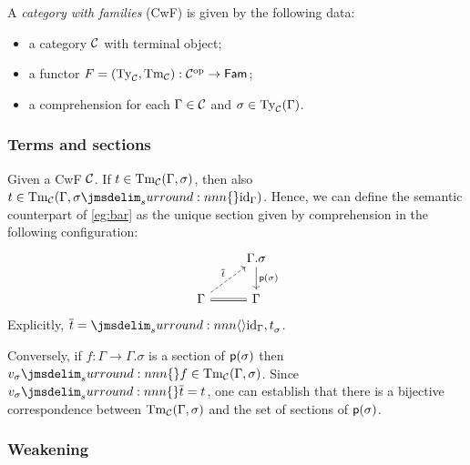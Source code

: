 \documentclass[a4paper]{article}
\begin{document}
\begin{definition}
  A \emph{category with families} (CwF) is given by the following data:
  \begin{itemize}
  \item a category $\mathcal{C}$ with terminal object;
  \item a functor $F = (\operatorname{Ty}_{\mathcal{C}},\operatorname{Tm}_{\mathcal{C}}) : \mathcal{C}^{\mathrm{op}} \to \mathsf{Fam}$;
  \item a comprehension for each $\Gamma \in \mathcal{C}$ and $\sigma \in \operatorname{Ty}_{\mathcal{C}}(\Gamma)$.
  \end{itemize}
\end{definition}

\subsubsection{Terms and sections}\label{sec:tas}

Given a CwF $\mathcal{C}$.
If $t \in \operatorname{Tm}_{\mathcal{C}}(\Gamma,\sigma)$, then also $t \in \Tm{\cC}(\Gamma,\semSubst{\sigma}{\id{\Gamma}})$.
Hence, we can define the semantic counterpart of \cref{eg:bar} as the unique section given by comprehension in the following configuration:
\[\begin{tikzcd}
    & {\Gamma.\sigma} \\
    \Gamma & \Gamma
    \arrow["{\ctxExt(\sigma)}", from=1-2, to=2-2]
    \arrow["{\ctxSec{t}}", dashed, from=2-1, to=1-2]
    \arrow[equals, from=2-1, to=2-2]
  \end{tikzcd}\]
Explicitly, $\ctxSec{t} = \semComp{\id{\Gamma}}{t}{\sigma}$.

Conversely, if $f : \Gamma \to \Gamma.\sigma$ is a section of $\operatorname{\mathsf{p}}(\sigma)$ then $\semSubst{v_{\sigma}}{f} \in \Tm{\cC}(\Gamma,\sigma)$.
Since $\semSubst{v_{\sigma}}{\ctxSec{t}} = t$, one can establish that there is a bijective correspondence between $\operatorname{Tm}_{\mathcal{C}}(\Gamma,\sigma)$ and the set of sections of $\operatorname{\mathsf{p}}(\sigma)$.

\subsubsection{Weakening}\label{sec:w}
\end{document}

